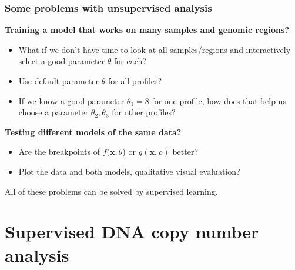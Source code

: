 \documentclass{beamer}
\begin{document}
\begin{frame}
  \frametitle{Some problems with unsupervised analysis}
  \textbf{Training a model that works on many samples and genomic
    regions?} 
  \begin{itemize}
  \item What if we don't have time to look at all samples/regions and
      interactively select a good parameter $\theta$ for each?
  \item Use default parameter $\theta$ for all profiles?
  \item If we know a good parameter $\theta_1=8$ for one profile, how
    does that help us choose a parameter $\theta_2, \theta_3$ for
    other profiles?
  \end{itemize}
  \textbf{Testing different models of the same data?} 
    \begin{itemize}
    \item   Are the breakpoints of $f(\mathbf x, \theta$) or
  $g(\mathbf x, \rho)$ better?
    \item Plot the data and both models, qualitative visual evaluation?
    \end{itemize}
  All of these problems can be solved by supervised learning.
\end{frame}

\section{Supervised DNA copy number analysis}
\end{document}
